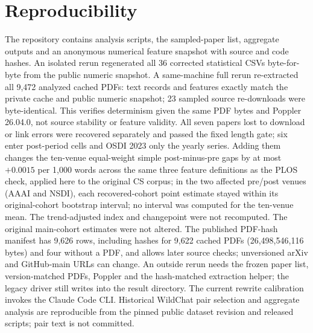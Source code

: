 \documentclass[10pt,twocolumn]{article}
\begin{document}
\section{Reproducibility}
The repository contains analysis scripts, the sampled-paper list, aggregate outputs and an anonymous numerical feature snapshot with source and code hashes. An isolated rerun regenerated all 36 corrected statistical CSVs byte-for-byte from the public numeric snapshot. A same-machine full rerun re-extracted all 9,472 analyzed cached PDFs: text records and features exactly match the private cache and public numeric snapshot; 23 sampled source re-downloads were byte-identical. This verifies determinism given the same PDF bytes and Poppler 26.04.0, not source stability or feature validity. All seven papers lost to download or link errors were recovered separately and passed the fixed length gate; six enter post-period cells and OSDI 2023 only the yearly series. Adding them changes the ten-venue equal-weight simple post-minus-pre gaps by at most $+0.0015$ per 1,000 words across the same three feature definitions as the PLOS check, applied here to the original CS corpus; in the two affected pre/post venues (AAAI and NSDI), each recovered-cohort point estimate stayed within its original-cohort bootstrap interval; no interval was computed for the ten-venue mean. The trend-adjusted index and changepoint were not recomputed. The original main-cohort estimates were not altered. The published PDF-hash manifest has 9,626 rows, including hashes for 9,622 cached PDFs (26,498,546,116 bytes) and four without a PDF, and allows later source checks; unversioned arXiv and GitHub-main URLs can change. An outside rerun needs the frozen paper list, version-matched PDFs, Poppler and the hash-matched extraction helper; the legacy driver still writes into the result directory. The current rewrite calibration invokes the Claude Code CLI. Historical WildChat pair selection and aggregate analysis are reproducible from the pinned public dataset revision and released scripts; pair text is not committed.
\end{document}
